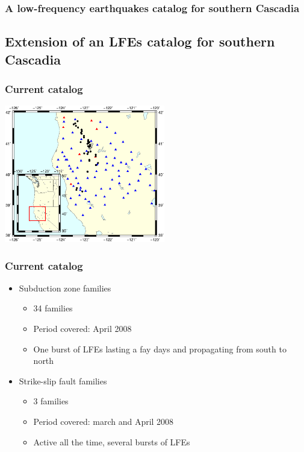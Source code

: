 \documentclass{beamer}
\begin{document}
	\begin{frame}
		\frametitle{A low-frequency earthquakes catalog for southern Cascadia}
	\end{frame}


	\subsection{Extension of an LFEs catalog for southern Cascadia}
	
	\begin{frame}
		\frametitle{Current catalog}
		\begin{center}
			\includegraphics[trim={1cm 3cm 1cm 8cm}, clip, width=7cm]{catalog/families_map.eps}
		\end{center}
	\end{frame}

	\begin{frame}
		\frametitle{Current catalog}
		\begin{itemize}
			\item Subduction zone families
			\begin{itemize}
				\item 34 families
				\item Period covered: April 2008
				\item One burst of LFEs lasting a fay days and propagating from south to north
			\end{itemize}
			\item Strike-slip fault families
			\begin{itemize}
				\item 3 families
				\item Period covered: march and April 2008
				\item Active all the time, several bursts of LFEs
			\end{itemize}
		\end{itemize}
	\end{frame}
\end{document}
